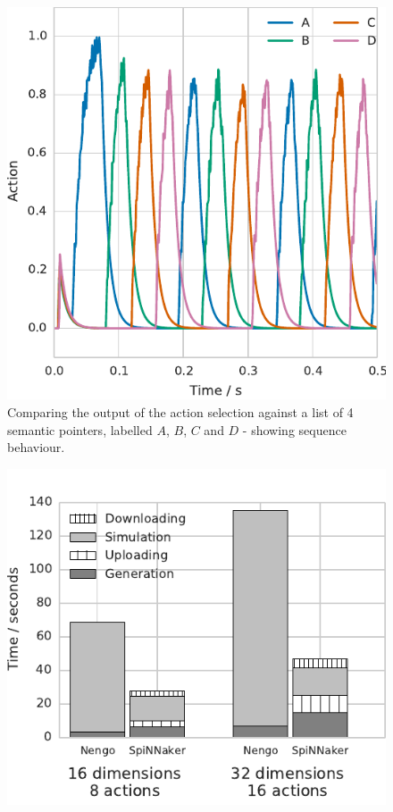 \documentclass[conference]{IEEEtran}
\begin{document}
  \begin{figure}[!t]
    \includegraphics{figures/sequence}
    \caption{Comparing the output of the action selection against a list of 4 semantic pointers, labelled $A$, $B$, $C$ and $D$ - showing sequence behaviour.}
    \label{fig:results/sequence}
  \end{figure}

  \begin{figure}[!t]
    \includegraphics{figures/spa_wall_clock}
    \caption{}
    \label{fig:results/spa-wall-clock}
  \end{figure}
\end{document}
